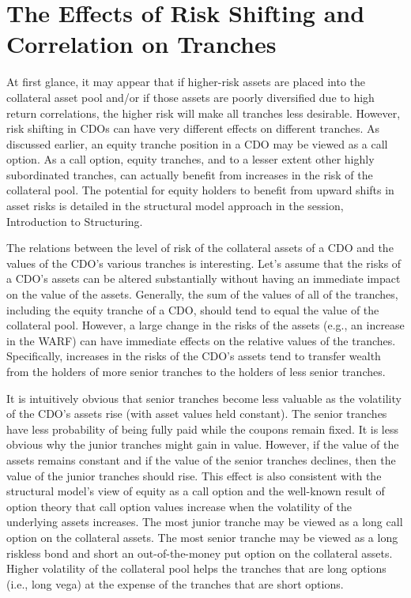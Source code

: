 \documentclass[11pt]{article}
\begin{document}
\section*{The Effects of Risk Shifting and Correlation on Tranches}
At first glance, it may appear that if higher-risk assets are placed into the collateral asset pool and/or if those assets are poorly diversified due to high return correlations, the higher risk will make all tranches less desirable. However, risk shifting in CDOs can have very different effects on different tranches. As discussed earlier, an equity tranche position in a CDO may be viewed as a call option. As a call option, equity tranches, and to a lesser extent other highly subordinated tranches, can actually benefit from increases in the risk of the collateral pool. The potential for equity holders to benefit from upward shifts in asset risks is detailed in the structural model approach in the session, Introduction to Structuring.

The relations between the level of risk of the collateral assets of a CDO and the values of the CDO's various tranches is interesting. Let's assume that the risks of a CDO's assets can be altered substantially without having an immediate impact on the value of the assets. Generally, the sum of the values of all of the tranches, including the equity tranche of a CDO, should tend to equal the value of the collateral pool. However, a large change in the risks of the assets (e.g., an increase in the WARF) can have immediate effects on the relative values of the tranches. Specifically, increases in the risks of the CDO's assets tend to transfer wealth from the holders of more senior tranches to the holders of less senior tranches.

It is intuitively obvious that senior tranches become less valuable as the volatility of the CDO's assets rise (with asset values held constant). The senior tranches have less probability of being fully paid while the coupons remain fixed. It is less obvious why the junior tranches might gain in value. However, if the value of the assets remains constant and if the value of the senior tranches declines, then the value of the junior tranches should rise. This effect is also consistent with the structural model's view of equity as a call option and the well-known result of option theory that call option values increase when the volatility of the underlying assets increases. The most junior tranche may be viewed as a long call option on the collateral assets. The most senior tranche may be viewed as a long riskless bond and short an out-of-the-money put option on the collateral assets. Higher volatility of the collateral pool helps the tranches that are long options (i.e., long vega) at the expense of the tranches that are short options.
\end{document}
